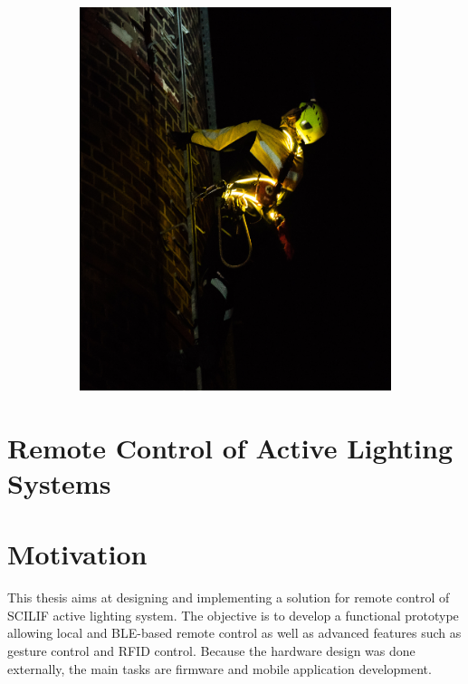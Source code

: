 \begin{figure} [!ht]
\begin{subfigure}[b]{0.496\textwidth}
             \includegraphics[width=\textwidth]{01.INTRO/Figs/active_lighting_system03.jpg}
         \end{subfigure}
    \end{figure}      
     
    
\section{Remote Control of Active Lighting Systems}

\section{Motivation}
    This thesis aims at designing and implementing a solution for remote control of SCILIF active lighting system. The objective is to develop a functional prototype allowing local and BLE-based remote control as well as advanced features such as gesture control and RFID control. Because the hardware design was done externally, the main tasks are firmware and mobile application development.
    
